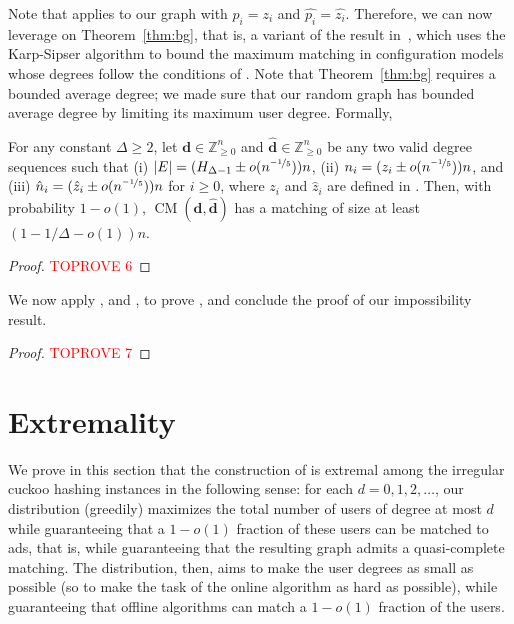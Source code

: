 \documentclass[11pt]{article}
\DeclareMathOperator*{\CM}{CM}
\begin{document}
Note that  applies to our graph with $p_i=z_i$ and $\hat{p_i}=\hat{z_i}$. Therefore, we can now leverage on Theorem~\ref{thm:bg}, that is, a variant of the result in~\cite{bg15}, which uses the Karp-Sipser algorithm to bound the maximum matching in  configuration models whose degrees follow the conditions of . Note that Theorem~\ref{thm:bg} requires a bounded average degree; we made sure that our random graph has bounded average degree by limiting its maximum user degree. Formally, 
\begin{lemma}\label{lem:karp-sipser-conf-model}
For any constant $\Delta\geq 2$, let $\mathbf{d}\in\mathbb{Z}_{\geq0}^n$ and $\mathbf{\hat{d}}\in\mathbb{Z}_{\geq0}^n$ be any two valid degree sequences such that (i) $|E|=(H_{\Delta-1}\pm o(n^{\nicefrac{-1}5}))n$, (ii) $n_i=(z_i \pm o(n^{\nicefrac{-1}5}))n$, and (iii) $\hat{n}_i = (\hat{z}_i \pm o(n^{\nicefrac{-1}5}))n$ for $i\geq 0$, where $z_i$ and $\hat{z}_i$ are defined in . Then, with probability $1-o(1)$, $\CM(\mathbf{d}, \mathbf{\hat{d}})$ has a matching of size at least $(1-1/\Delta -o(1))n$.
\end{lemma}
\begin{proof}\textcolor{red}{TOPROVE 6}\end{proof}
We now apply ,  and , to prove , and conclude the proof of our impossibility result.
\begin{proof}\textcolor{red}{TOPROVE 7}\end{proof}

\section{Extremality}\label{sec:tightness}

We prove in this section that the construction of  is extremal among the irregular cuckoo hashing instances in the following sense: for each $d = 0, 1, 2, \ldots$, our distribution (greedily) maximizes the total number of users of degree at most $d$ while guaranteeing that a $1-o(1)$ fraction of these users can be matched to ads, that is, while guaranteeing that the resulting graph admits a quasi-complete matching. The distribution, then, aims to make the user degrees as small as possible (so to make the task of the  online algorithm as hard  as possible), while guaranteeing that  offline algorithms can match a $1-o(1)$ fraction of the users.
\end{document}
